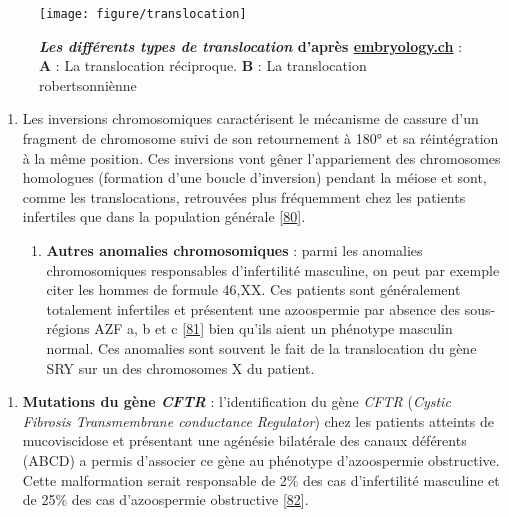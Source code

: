 \documentclass[12pt,a4paper,twoside]{ugathesis}
\providecommand{\tightlist}{%
  \setlength{\itemsep}{0pt}\setlength{\parskip}{0pt}}
\theoremstyle{definition}
\theoremstyle{definition}
\theoremstyle{definition}
\theoremstyle{remark}
\begin{document}
\begin{figure}

{\centering \texttt{[image: figure/translocation]} 

}

\caption[Les différents types de translocation]{\textbf{\emph{Les différents types de
translocation} d'après
\href{http://www.embryology.ch/francais/kchromaber/abweichende03.html}{embryology.ch}}
: \textbf{A} : La translocation réciproque. \textbf{B} : La
translocation robertsonniènne}\label{fig:figtranslocation}
\end{figure}

\begin{enumerate}
\def\labelenumi{\roman{enumi}.}
\setcounter{enumi}{1}
\item
  Les inversions chromosomiques caractérisent le mécanisme de cassure
  d'un fragment de chromosome suivi de son retournement à 180° et sa
  réintégration à la même position. Ces inversions vont gêner
  l'appariement des chromosomes homologues (formation d'une boucle
  d'inversion) pendant la méiose et sont, comme les translocations,
  retrouvées plus fréquemment chez les patients infertiles que dans la
  population générale {[}\protect\hyperlink{ref-Krausz2000}{80}{]}.

  \begin{enumerate}
  \def\labelenumii{\alph{enumii}.}
  \setcounter{enumii}{2}
  \tightlist
  \item
    \textbf{Autres anomalies chromosomiques} : parmi les anomalies
    chromosomiques responsables d'infertilité masculine, on peut par
    exemple citer les hommes de formule 46,XX. Ces patients sont
    généralement totalement infertiles et présentent une azoospermie par
    absence des sous- régions AZF a, b et c
    {[}\protect\hyperlink{ref-Vorona2007}{81}{]} bien qu'ils aient un
    phénotype masculin normal. Ces anomalies sont souvent le fait de la
    translocation du gène SRY sur un des chromosomes X du patient.
  \end{enumerate}
\end{enumerate}

\begin{enumerate}
\def\labelenumi{\arabic{enumi}.}
\setcounter{enumi}{2}
\tightlist
\item
  \textbf{Mutations du gène \emph{CFTR} }: l'identification du gène
  \emph{CFTR} (\emph{Cystic Fibrosis Transmembrane conductance
  Regulator}) chez les patients atteints de mucoviscidose et présentant
  une agénésie bilatérale des canaux déférents (ABCD) a permis
  d'associer ce gène au phénotype d'azoospermie obstructive. Cette
  malformation serait responsable de 2\% des cas d'infertilité masculine
  et de 25\% des cas d'azoospermie obstructive
  {[}\protect\hyperlink{ref-Yu2012}{82}{]}.
\end{enumerate}
\end{document}
